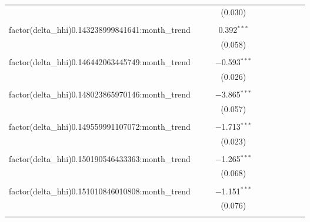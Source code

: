 \begin{table}[H]
{\begin{tabular}{@{\extracolsep{5pt}}lccccccccc}
   &  &  & (0.030) &  &  &  &  &  &  \\  

   & & & & & & & & & \\  

  factor(delta\_hhi)0.143238999841641:month\_trend &  &  & 0.392$^{***}$ &  &  &  &  &  &  \\  

   &  &  & (0.058) &  &  &  &  &  &  \\  

   & & & & & & & & & \\  

  factor(delta\_hhi)0.146442063445749:month\_trend &  &  & $-$0.593$^{***}$ &  &  &  &  &  &  \\  

   &  &  & (0.026) &  &  &  &  &  &  \\  

   & & & & & & & & & \\  

  factor(delta\_hhi)0.148023865970146:month\_trend &  &  & $-$3.865$^{***}$ &  &  &  &  &  &  \\  

   &  &  & (0.057) &  &  &  &  &  &  \\  

   & & & & & & & & & \\  

  factor(delta\_hhi)0.149559991107072:month\_trend &  &  & $-$1.713$^{***}$ &  &  &  &  &  &  \\  

   &  &  & (0.023) &  &  &  &  &  &  \\  

   & & & & & & & & & \\  

  factor(delta\_hhi)0.150190546433363:month\_trend &  &  & $-$1.265$^{***}$ &  &  &  &  &  &  \\  

   &  &  & (0.068) &  &  &  &  &  &  \\  

   & & & & & & & & & \\  

  factor(delta\_hhi)0.151010846010808:month\_trend &  &  & $-$1.151$^{***}$ &  &  &  &  &  &  \\  

   &  &  & (0.076) &  &  &  &  &  &  \\  

   & & & & & & & & & \\  


\end{tabular}}
\end{table}
